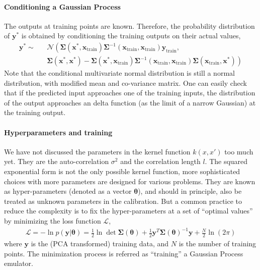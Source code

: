 \paragraph{Conditioning a Gaussian Process} The outputs at training points are known.
Therefore, the probability distribution of $\mathbf{y}^*$ is obtained by conditioning the training outputs on their actual values,
\begin{eqnarray}
\mathbf{y}^* \sim &&\mathcal{N}\left(
\mathbf{\Sigma}(\mathbf{x}^*, \mathbf{x}_{\textrm{train}} )
\mathbf{\Sigma}^{-1}(\mathbf{x}_{\textrm{train}}, \mathbf{x}_{\textrm{train}} )\mathbf{y}_{\textrm{train}},\right.\\\nonumber
&&\left.
\mathbf{\Sigma}(\mathbf{x}^*, \mathbf{x}^*) - 
\mathbf{\Sigma}(\mathbf{x}^*, \mathbf{x}_{\textrm{train}} )
\mathbf{\Sigma}^{-1}(\mathbf{x}_{\textrm{train}}, \mathbf{x}_{\textrm{train}} )
\mathbf{\Sigma}(\mathbf{x}_{\textrm{train}},\mathbf{x}^*)
\right)
\end{eqnarray}
Note that the conditional multivariate normal distribution is still a normal distribution, with modified mean and co-variance matrix.
One can easily check that if the predicted input approaches one of the training inputs, the distribution of the output approaches an delta function (as the limit of a narrow Gaussian) at the training output.

\paragraph{Hyperparameters and training} We have not discussed the parameters in the kernel function $k(x, x')$ too much yet.
They are the auto-correlation $\sigma^2$ and the correlation length $l$. 
The squared exponential form is not the only possible kernel function, more sophisticated choices with more parameters are designed for various problems.
They are known as hyper-parameters (denoted as a vector $\mathbf{\theta}$), and should in principle, also be treated as unknown parameters in the calibration.
But a common practice to reduce the complexity is to fix the hyper-parameters at a set of ``optimal values'' by minimizing the loss function $\mathcal{L}$,
\begin{eqnarray}
\mathcal{L} = -\ln p(\mathbf{y}|\mathbf{\theta}) = \frac{1}{2}\ln \det \mathbf{\Sigma}(\mathbf{\theta})  + \frac{1}{2}\mathbf{y}^T \mathbf{\Sigma}(\mathbf{\theta})^{-1} \mathbf{y} + \frac{N}{2}\ln(2\pi)
\end{eqnarray}
where $\mathbf{y}$ is the (PCA transformed) training data, and $N$ is the number of training points.
The minimization process is referred as ``training'' a Gaussian Process emulator.

